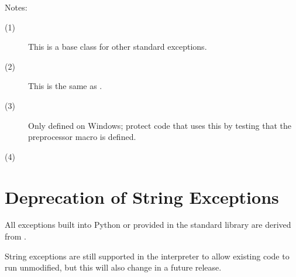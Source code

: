 \noindent
Notes:
\begin{description}
\item[(1)]
  This is a base class for other standard exceptions.

\item[(2)]
  This is the same as .

\item[(3)]
  Only defined on Windows; protect code that uses this by testing that
  the preprocessor macro  is defined.

\item[(4)]
\end{description}


\section{Deprecation of String Exceptions}

All exceptions built into Python or provided in the standard library
are derived from .

String exceptions are still supported in the interpreter to allow
existing code to run unmodified, but this will also change in a future 
release.
